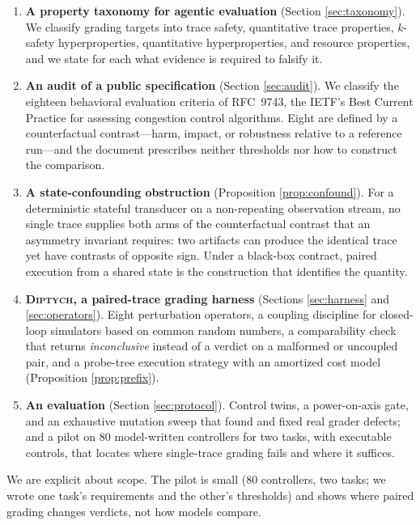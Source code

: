 \documentclass[sigconf,review,anonymous]{acmart}
\newcommand{\sys}{\textsc{Diptych}}
\begin{document}
	\begin{enumerate}
		\item \textbf{A property taxonomy for agentic evaluation} (Section
		\ref{sec:taxonomy}). We classify grading targets into trace safety,
		quantitative trace properties, $k$-safety hyperproperties, quantitative
		hyperproperties, and resource properties, and we state for each what
		evidence is required to falsify it.
		
		\item \textbf{An audit of a public specification} (Section \ref{sec:audit}).
		We classify the eighteen behavioral evaluation criteria of RFC~9743, the
		IETF's Best Current Practice for assessing congestion control
		algorithms. Eight are defined by a counterfactual contrast---harm,
		impact, or robustness relative to a reference run---and the document
		prescribes neither thresholds nor how to construct the comparison.
		
		\item \textbf{A state-confounding obstruction} (Proposition
		\ref{prop:confound}). For a deterministic stateful transducer on a
		non-repeating observation stream, no single trace supplies both arms of the
		counterfactual contrast that an asymmetry invariant requires: two
		artifacts can produce the identical trace yet have contrasts of opposite
		sign. Under a black-box contract, paired execution from a shared state
		is the construction that identifies the quantity.
		
		\item \textbf{\sys{}, a paired-trace grading harness} (Sections
		\ref{sec:harness} and \ref{sec:operators}). Eight perturbation operators, a
		coupling discipline for closed-loop simulators based on common random
		numbers, a comparability check that returns \emph{inconclusive}
		instead of a verdict on a malformed or uncoupled pair, and a probe-tree execution strategy with an amortized cost
		model (Proposition \ref{prop:prefix}).
		
		\item \textbf{An evaluation} (Section \ref{sec:protocol}). Control
		twins, a power-on-axis gate, and an exhaustive mutation sweep that found
		and fixed real grader defects; and a pilot on 80 model-written
		controllers for two tasks, with executable controls, that locates
		where single-trace grading fails and where it suffices.
	\end{enumerate}

	We are explicit about scope. The pilot is small (80 controllers, two
	tasks; we wrote one task's requirements and the other's thresholds) and
	shows where paired grading changes verdicts, not how models compare.
	
\end{document}
